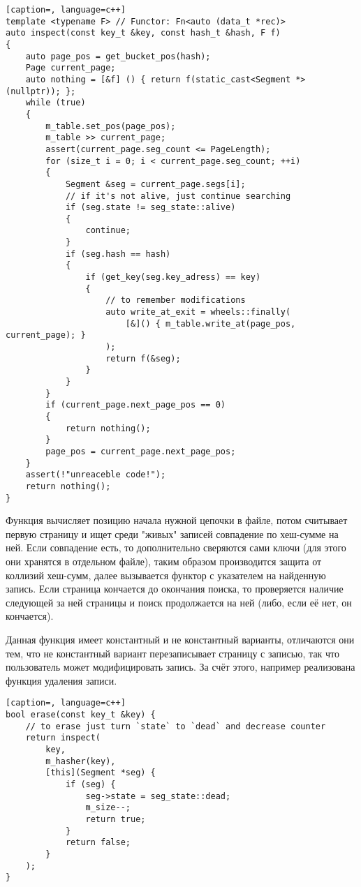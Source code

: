 \documentclass[12pt, a4paper]{fallen_report}
\begin{document}
\begin{lstlisting}[caption=, language=c++]
template <typename F> // Functor: Fn<auto (data_t *rec)>
auto inspect(const key_t &key, const hash_t &hash, F f) 
{
    auto page_pos = get_bucket_pos(hash);
    Page current_page;
    auto nothing = [&f] () { return f(static_cast<Segment *>(nullptr)); };
    while (true) 
    {
        m_table.set_pos(page_pos);
        m_table >> current_page;
        assert(current_page.seg_count <= PageLength);
        for (size_t i = 0; i < current_page.seg_count; ++i) 
        {
            Segment &seg = current_page.segs[i];
            // if it's not alive, just continue searching
            if (seg.state != seg_state::alive) 
            {
                continue; 
            }
            if (seg.hash == hash) 
            {
                if (get_key(seg.key_adress) == key) 
                {
                    // to remember modifications
                    auto write_at_exit = wheels::finally(
                        [&]() { m_table.write_at(page_pos, current_page); }
                    );
                    return f(&seg);
                }
            }
        }
        if (current_page.next_page_pos == 0) 
        { 
            return nothing(); 
        }
        page_pos = current_page.next_page_pos;
    }
    assert(!"unreaceble code!");
    return nothing();
}
\end{lstlisting}

Функция вычисляет позицию начала нужной цепочки в файле, потом считывает первую страницу и ищет среди "живых" записей совпадение по хеш-сумме на ней. Если совпадение есть, то дополнительно сверяются сами ключи (для этого они хранятся в отдельном файле), таким образом производится защита от коллизий хеш-сумм, далее вызывается функтор с указателем на найденную запись. Если страница кончается до окончания поиска, то проверяется наличие следующей за ней страницы и поиск продолжается на ней (либо, если её нет, он кончается).

Данная функция имеет константный и не константный варианты, отличаются они тем, что не константный вариант перезаписывает страницу с записью, так что пользователь может модифицировать запись. За счёт этого, например реализована функция удаления записи.

\begin{lstlisting}[caption=, language=c++]
bool erase(const key_t &key) {
    // to erase just turn `state` to `dead` and decrease counter
    return inspect(
        key,
        m_hasher(key),
        [this](Segment *seg) {
            if (seg) {
                seg->state = seg_state::dead;
                m_size--;
                return true;
            }
            return false;
        }
    );
}
\end{lstlisting}
\end{document}
